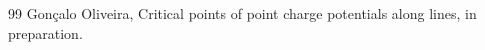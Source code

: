 \documentclass{article}
\begin{document}
\begin{thebibliography}{99}
Gon\c{c}alo Oliveira, Critical points of point charge potentials along lines, in preparation.





\end{thebibliography}
\end{document}
